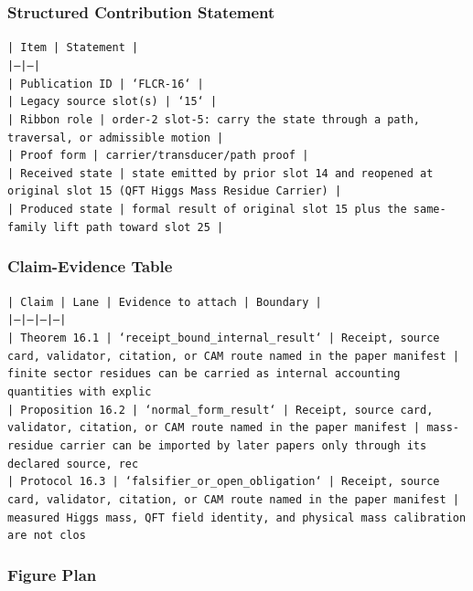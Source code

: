 \documentclass[11pt]{article}
\begin{document}
\subsubsection*{Structured Contribution Statement}

\noindent\texttt{| Item | Statement |}\\
\noindent\texttt{|---|---|}\\
\noindent\texttt{| Publication ID | `FLCR-16` |}\\
\noindent\texttt{| Legacy source slot(s) | `15` |}\\
\noindent\texttt{| Ribbon role | order-2 slot-5: carry the state through a path, traversal, or admissible motion |}\\
\noindent\texttt{| Proof form | carrier/transducer/path proof |}\\
\noindent\texttt{| Received state | state emitted by prior slot 14 and reopened at original slot 15 (QFT Higgs Mass Residue Carrier) |}\\
\noindent\texttt{| Produced state | formal result of original slot 15 plus the same-family lift path toward slot 25 |}\\

\subsubsection*{Claim-Evidence Table}

\noindent\texttt{| Claim | Lane | Evidence to attach | Boundary |}\\
\noindent\texttt{|---|---|---|---|}\\
\noindent\texttt{| Theorem 16.1 | `receipt\_bound\_internal\_result` | Receipt, source card, validator, citation, or CAM route named in the paper manifest | finite sector residues can be carried as internal accounting quantities with explic}\\
\noindent\texttt{| Proposition 16.2 | `normal\_form\_result` | Receipt, source card, validator, citation, or CAM route named in the paper manifest | mass-residue carrier can be imported by later papers only through its declared source, rec}\\
\noindent\texttt{| Protocol 16.3 | `falsifier\_or\_open\_obligation` | Receipt, source card, validator, citation, or CAM route named in the paper manifest | measured Higgs mass, QFT field identity, and physical mass calibration are not clos}\\

\subsubsection*{Figure Plan}
\end{document}
